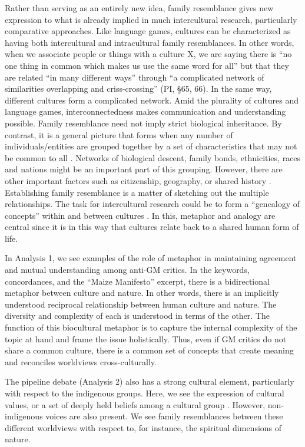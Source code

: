 Rather than serving as an entirely new idea, family resemblance gives new expression to what is already implied in much intercultural research, particularly comparative approaches. Like language games, cultures can be characterized as having both intercultural and intracultural family resemblances. In other words, when we associate people or things with a culture X, we are saying there is ``no one thing in common which makes us use the same word for all'' but that they are related ``in many different ways'' through ``a complicated network of similarities overlapping and criss-crossing'' (PI, \S 65, 66). In the same way, different cultures form a complicated network. Amid the plurality of cultures and language games, interconnectedness makes communication and understanding possible. Family resemblance need not imply strict biological inheritance. By contrast, it is a general picture that forms when any number of individuals/entities are grouped together by a set of characteristics that may not be common to all \citep{Ginzburg2004a}. Networks of biological descent, family bonds, ethnicities, races and nations might be an important part of this grouping. However, there are other important factors such as citizenship, geography, or shared history \citep{Sluga2011a}. Establishing family resemblance is a matter of sketching out the multiple relationships. The task for intercultural research could be to form a ``genealogy of concepts'' within and between cultures \citep{Canfield1993a}. In this, metaphor and analogy are central since it is in this way that cultures relate back to a shared human form of life.

In Analysis 1, we see examples of the role of metaphor in maintaining agreement and mutual understanding among anti-GM critics. In the keywords, concordances, and the ``Maize Manifesto'' excerpt, there is a bidirectional metaphor between culture and nature. In other words, there is an implicitly understood reciprocal relationship between human culture and nature. The diversity and complexity of each is understood in terms of the other. The function of this biocultural metaphor is to capture the internal complexity of the topic at hand and frame the issue holistically. Thus, even if GM critics do not share a common culture, there is a common set of concepts that create meaning and reconciles worldviews cross-culturally.  

The pipeline debate (Analysis 2) also has a strong cultural element, particularly with respect to the indigenous groups. Here, we see the expression of cultural values, or a set of deeply held beliefs among a cultural group \citep[95]{Martin2010a}. However, non-indigenous voices are also present. We see family resemblances between these different worldviews with respect to, for instance, the spiritual dimensions of nature.

